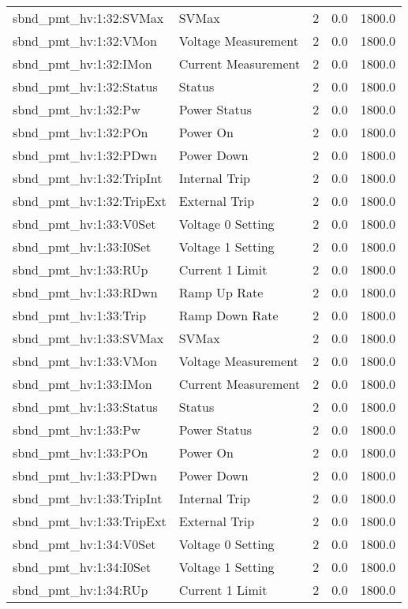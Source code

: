\begin{center}
\begin{longtable}{l | l l l l }
sbnd\_pmt\_hv:1:32:SVMax & SVMax & 2 & 0.0 & 1800.0\\ 
sbnd\_pmt\_hv:1:32:VMon & Voltage Measurement & 2 & 0.0 & 1800.0\\ 
sbnd\_pmt\_hv:1:32:IMon & Current Measurement & 2 & 0.0 & 1800.0\\ 
sbnd\_pmt\_hv:1:32:Status & Status & 2 & 0.0 & 1800.0\\ 
sbnd\_pmt\_hv:1:32:Pw & Power Status & 2 & 0.0 & 1800.0\\ 
sbnd\_pmt\_hv:1:32:POn & Power On & 2 & 0.0 & 1800.0\\ 
sbnd\_pmt\_hv:1:32:PDwn & Power Down & 2 & 0.0 & 1800.0\\ 
sbnd\_pmt\_hv:1:32:TripInt & Internal Trip & 2 & 0.0 & 1800.0\\ 
sbnd\_pmt\_hv:1:32:TripExt & External Trip & 2 & 0.0 & 1800.0\\ 
sbnd\_pmt\_hv:1:33:V0Set & Voltage 0 Setting & 2 & 0.0 & 1800.0\\ 
sbnd\_pmt\_hv:1:33:I0Set & Voltage 1 Setting & 2 & 0.0 & 1800.0\\ 
sbnd\_pmt\_hv:1:33:RUp & Current 1 Limit & 2 & 0.0 & 1800.0\\ 
sbnd\_pmt\_hv:1:33:RDwn & Ramp Up Rate & 2 & 0.0 & 1800.0\\ 
sbnd\_pmt\_hv:1:33:Trip & Ramp Down Rate & 2 & 0.0 & 1800.0\\ 
sbnd\_pmt\_hv:1:33:SVMax & SVMax & 2 & 0.0 & 1800.0\\ 
sbnd\_pmt\_hv:1:33:VMon & Voltage Measurement & 2 & 0.0 & 1800.0\\ 
sbnd\_pmt\_hv:1:33:IMon & Current Measurement & 2 & 0.0 & 1800.0\\ 
sbnd\_pmt\_hv:1:33:Status & Status & 2 & 0.0 & 1800.0\\ 
sbnd\_pmt\_hv:1:33:Pw & Power Status & 2 & 0.0 & 1800.0\\ 
sbnd\_pmt\_hv:1:33:POn & Power On & 2 & 0.0 & 1800.0\\ 
sbnd\_pmt\_hv:1:33:PDwn & Power Down & 2 & 0.0 & 1800.0\\ 
sbnd\_pmt\_hv:1:33:TripInt & Internal Trip & 2 & 0.0 & 1800.0\\ 
sbnd\_pmt\_hv:1:33:TripExt & External Trip & 2 & 0.0 & 1800.0\\ 
sbnd\_pmt\_hv:1:34:V0Set & Voltage 0 Setting & 2 & 0.0 & 1800.0\\ 
sbnd\_pmt\_hv:1:34:I0Set & Voltage 1 Setting & 2 & 0.0 & 1800.0\\ 
sbnd\_pmt\_hv:1:34:RUp & Current 1 Limit & 2 & 0.0 & 1800.0\\ 

\end{longtable}
\end{center}
